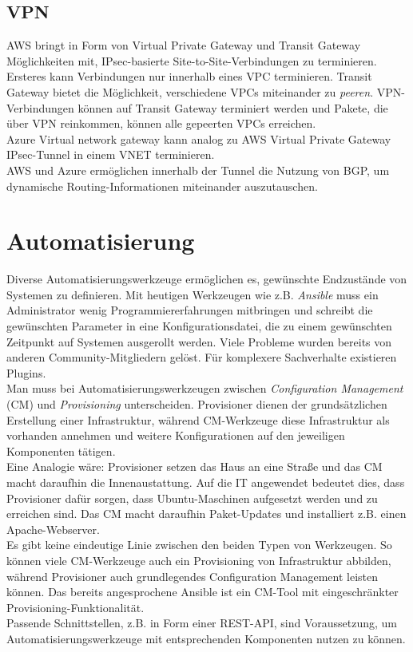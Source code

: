 \subsection{VPN}
AWS bringt in Form von Virtual Private Gateway und Transit Gateway Möglichkeiten mit, \gls{IPsec}-basierte \gls{Site-to-Site}-Verbindungen zu terminieren. Ersteres kann Verbindungen nur innerhalb eines \gls{VPC} terminieren. Transit Gateway bietet die Möglichkeit, verschiedene \gls{VPC}s miteinander zu \textit{peeren}. \gls{VPN}-Verbindungen können auf Transit Gateway terminiert werden und Pakete, die über \gls{VPN} reinkommen, können alle gepeerten \gls{VPC}s erreichen.\\
Azure Virtual network gateway kann analog zu AWS Virtual Private Gateway \gls{IPsec}-Tunnel in einem \gls{VNET} terminieren.\\
AWS und Azure ermöglichen innerhalb der Tunnel die Nutzung von \gls{BGP}, um dynamische Routing-Informationen miteinander auszutauschen.


\section{Automatisierung}\label{automatisierung}

Diverse Automatisierungswerkzeuge ermöglichen es, gewünschte Endzustände von Systemen zu definieren. Mit heutigen Werkzeugen wie z.B. \textit{Ansible} muss ein Administrator wenig Programmiererfahrungen mitbringen und schreibt die gewünschten Parameter in eine Konfigurationsdatei, die zu einem gewünschten Zeitpunkt auf Systemen ausgerollt werden. Viele Probleme wurden bereits von anderen Community-Mitgliedern gelöst. Für komplexere Sachverhalte existieren Plugins.\\
Man muss bei Automatisierungswerkzeugen zwischen \textit{Configuration Management} (CM) und \textit{Provisioning} unterscheiden. Provisioner dienen der grundsätzlichen Erstellung einer Infrastruktur, während \gls{CM}-Werkzeuge diese Infrastruktur als vorhanden annehmen und weitere Konfigurationen auf den jeweiligen Komponenten tätigen\cite[S.20]{Brikman2019}.\\
Eine Analogie wäre: Provisioner setzen das Haus an eine Straße und das \gls{CM} macht daraufhin die Innenaustattung. Auf die IT angewendet bedeutet dies, dass Provisioner dafür sorgen, dass Ubuntu-Maschinen aufgesetzt werden und zu erreichen sind. Das \gls{CM} macht daraufhin Paket-Updates und installiert z.B. einen Apache-Webserver.\\
Es gibt keine eindeutige Linie zwischen den beiden Typen von Werkzeugen. So können viele \gls{CM}-Werkzeuge auch ein Provisioning von Infrastruktur abbilden, während Provisioner auch grundlegendes Configuration Management leisten können\cite[S.20]{Brikman2019}. Das bereits angesprochene Ansible ist ein \gls{CM}-Tool mit eingeschränkter Provisioning-Funktionalität.\\
Passende Schnittstellen, z.B. in Form einer REST-API, sind Voraussetzung, um Automatisierungswerkzeuge mit entsprechenden Komponenten nutzen zu können.

